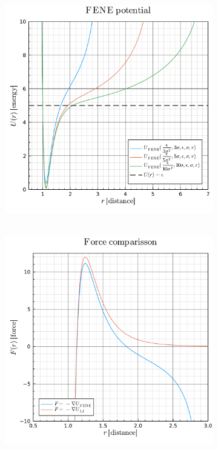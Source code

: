 \documentclass[main.tex]{subfiles}
\begin{document}

\begin{figure}[ht!]
    \centering
    \begin{subfigure}[c]{0.48\textwidth}
        \centering
        \includegraphics[width=\textwidth]{imgs/hw4/FENEComparison.pdf}
        \caption{~}\label{fig:FENEcomparison}
    \end{subfigure}
    \begin{subfigure}[c]{0.48\textwidth}
        \centering
        \includegraphics[width=\textwidth]{imgs/hw4/forceComparison.pdf}

\end{subfigure}
\end{figure}
\end{document}
